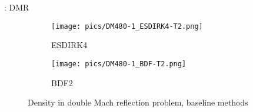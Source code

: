 \documentclass[aspectratio=169,serif]{beamer} %
\begin{document}
\begin{frame}{\secname: DMR}
  \scriptsize
  \begin{figure}[htbp]
    \centering
    \begin{subfigure}{0.5\textwidth}
        \texttt{[image: pics/DM480-1\_ESDIRK4-T2.png]}
        \caption[]{ESDIRK4}
        \label{sfig:DM480_ESDIRK4}
    \end{subfigure}\hfill
    \begin{subfigure}{0.5\textwidth}
        \texttt{[image: pics/DM480-1\_BDF-T2.png]}
        \caption[]{BDF2}
        \label{sfig:DM480_BDF2}
    \end{subfigure}
    \caption{Density in double Mach reflection problem, baseline methods}
    \label{fig:DM480-3}
  \end{figure}
\end{frame}





\end{document}
